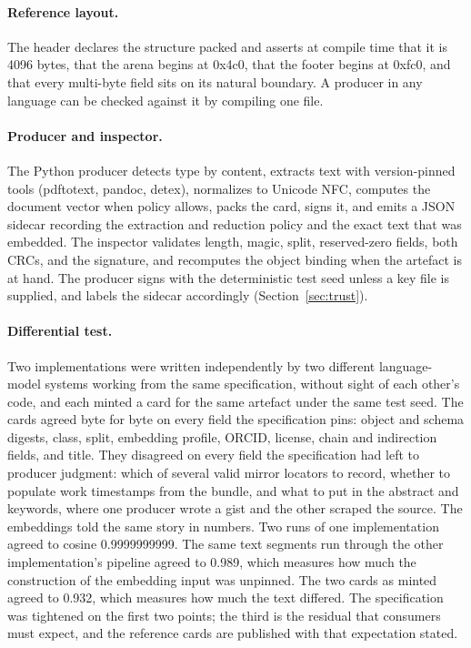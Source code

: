 \documentclass[sigconf]{acmart}
\begin{document}
\paragraph{Reference layout.} The header declares the structure packed and
asserts at compile time that it is 4096 bytes, that the arena begins at 0x4c0,
that the footer begins at 0xfc0, and that every multi-byte field sits on its
natural boundary. A producer in any language can be checked against it by
compiling one file.

\paragraph{Producer and inspector.} The Python producer detects type by
content, extracts text with version-pinned tools (pdftotext, pandoc, detex),
normalizes to Unicode NFC, computes the document vector when policy allows,
packs the card, signs it, and emits a JSON sidecar recording the extraction
and reduction policy and the exact text that was embedded. The inspector
validates length, magic, split, reserved-zero fields, both CRCs, and the
signature, and recomputes the object binding when the artefact is at hand.
The producer signs with the deterministic test seed unless a key file is
supplied, and labels the sidecar accordingly (Section~\ref{sec:trust}).

\paragraph{Differential test.} Two implementations were written independently
by two different language-model systems working from the same specification,
without sight of each other's code, and each minted a card for the same
artefact under the same test seed. The cards agreed byte for byte on every
field the specification pins: object and schema digests, class, split,
embedding profile, ORCID, license, chain and indirection fields, and title.
They disagreed on every field the specification had left to producer judgment:
which of several valid mirror locators to record, whether to populate work
timestamps from the bundle, and what to put in the abstract and keywords,
where one producer wrote a gist and the other scraped the source. The
embeddings told the same story in numbers. Two runs of one implementation
agreed to cosine 0.9999999999. The same text segments run through the other
implementation's pipeline agreed to 0.989, which measures how much the
construction of the embedding input was unpinned. The two cards as minted
agreed to 0.932, which measures how much the text differed. The specification
was tightened on the first two points; the third is the residual that
consumers must expect, and the reference cards are published with that
expectation stated.
\end{document}
